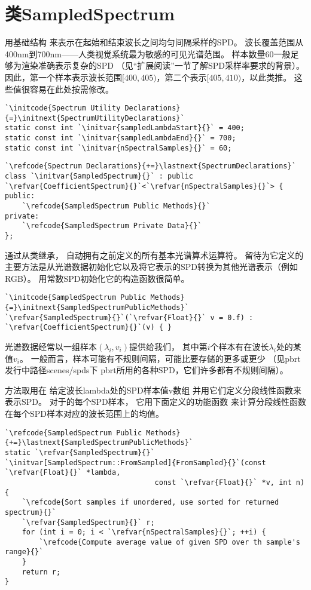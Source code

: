 \section{类SampledSpectrum}\label{sec:类SampledSpectrum}
用基础结构
来表示在起始和结束波长之间均匀间隔采样的SPD。
波长覆盖范围从400nm到700nm——人类视觉系统最为敏感的可见光谱范围。
样本数量60一般足够为渲染准确表示复杂的SPD
（见“扩展阅读”一节了解SPD采样率要求的背景）。
因此，第一个样本表示波长范围$[400,405)$，第二个表示$[405,410)$，以此类推。
这些值很容易在此处按需修改。
\begin{lstlisting}
`\initcode{Spectrum Utility Declarations}{=}\initnext{SpectrumUtilityDeclarations}`
static const int `\initvar{sampledLambdaStart}{}` = 400;
static const int `\initvar{sampledLambdaEnd}{}` = 700;
static const int `\initvar{nSpectralSamples}{}` = 60;
\end{lstlisting}
\begin{lstlisting}
`\refcode{Spectrum Declarations}{+=}\lastnext{SpectrumDeclarations}`
class `\initvar{SampledSpectrum}{}` : public `\refvar{CoefficientSpectrum}{}`<`\refvar{nSpectralSamples}{}`> {
public:
    `\refcode{SampledSpectrum Public Methods}{}`
private:
    `\refcode{SampledSpectrum Private Data}{}`
};
\end{lstlisting}

通过从类继承，
自动拥有之前定义的所有基本光谱算术运算符。
留待为它定义的主要方法是从光谱数据初始化它以及将它表示的SPD转换为其他光谱表示（例如RGB）。
用常数SPD初始化它的构造函数很简单。
\begin{lstlisting}
`\initcode{SampledSpectrum Public Methods}{=}\initnext{SampledSpectrumPublicMethods}`
`\refvar{SampledSpectrum}{}`(`\refvar{Float}{}` v = 0.f) : `\refvar{CoefficientSpectrum}{}`(v) { }
\end{lstlisting}

光谱数据经常以一组样本$(\lambda_i,v_i)$提供给我们，
其中第$i$个样本有在波长$\lambda_i$处的某值$v_i$。
一般而言，样本可能有不规则间隔，可能比要存储的更多或更少
（见pbrt发行中路径{\ttfamily scenes/spds}下
pbrt所用的各种SPD，它们许多都有不规则间隔）。

方法取用在
给定波长{\ttfamily lambda}处的SPD样本值{\ttfamily v}数组
并用它们定义分段线性函数来表示SPD。
对于的每个SPD样本，
它用下面定义的功能函数
来计算分段线性函数在每个SPD样本对应的波长范围上的均值。
\begin{lstlisting}
`\refcode{SampledSpectrum Public Methods}{+=}\lastnext{SampledSpectrumPublicMethods}`
static `\refvar{SampledSpectrum}{}` `\initvar[SampledSpectrum::FromSampled]{FromSampled}{}`(const `\refvar{Float}{}` *lambda,
                                   const `\refvar{Float}{}` *v, int n) {
    `\refcode{Sort samples if unordered, use sorted for returned spectrum}{}`
    `\refvar{SampledSpectrum}{}` r;
    for (int i = 0; i < `\refvar{nSpectralSamples}{}`; ++i) {
        `\refcode{Compute average value of given SPD over th sample's range}{}`
    }
    return r;
}
\end{lstlisting}

